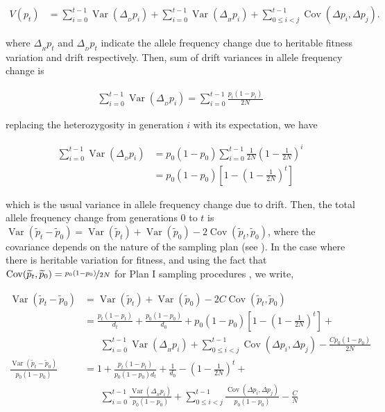 \documentclass[11pt]{article}
\DeclareMathOperator{\var}{Var}
\DeclareMathOperator{\cov}{Cov}
\begin{document}
\begin{align}
  V(p_t) &= \sum_{i=0}^{t-1} \var(\Delta_{_D} p_i) + \sum_{i=0}^{t-1} \var(\Delta_{_H} p_i) + \sum_{0 \le i < j}^{t-1} \cov(\Delta p_i, \Delta p_j).
\end{align}

where $\Delta_{_H} p_t$ and $\Delta_{_D} p_t$ indicate the allele frequency
change due to heritable fitness variation and drift respectively. Then, sum of
drift variances in allele frequency change is

\begin{align}
  \sum_{i=0}^{t-1} \var(\Delta_{_D} p_i) = \sum_{i=0}^{t-1} \frac{p_i(1-p_i)}{2N}
\end{align}

replacing the heterozygosity in generation $i$ with its expectation, we have

\begin{align}
  \sum_{i=0}^{t-1} \var(\Delta_{_D} p_i) &= p_0(1-p_0) \sum_{i=0}^{t-1} \frac{1}{2N} \left(1-\frac{1}{2N}\right)^i \\
                                         &= p_0(1-p_0) \left[1 - \left(1-\frac{1}{2N}\right)^t \right]
\end{align}

which is the usual variance in allele frequency change due to drift.  Then, the
total allele frequency change from generations $0$ to $t$ is
$\var(\widetilde{p}_t - \widetilde{p}_0) = \var(\widetilde{p}_t) +
\var(\widetilde{p}_0) - 2 \cov(\widetilde{p}_t, \widetilde{p}_0)$, where the
covariance depends on the nature of the sampling plan (see \cite{Nei1981-oy,
Waples1989-sj}). In the case where there is heritable variation for fitness,
and using the fact that $\cov(\widetilde{p}_t, \widetilde{p}_0) =
\nicefrac{p_0(1-p_0)}{2N}$ for Plan I sampling procedures
\parencite{Waples1989-sj}, we write,

\begin{align}
  \var(\widetilde{p}_t - \widetilde{p}_0) &= \var(\widetilde{p}_t) + \var(\widetilde{p}_0) - 2 C \cov(\widetilde{p}_t, \widetilde{p}_0) \\
                                          &= \frac{p_t(1-p_t)}{d_t}  + \frac{p_0(1-p_0)}{d_0} + p_0(1-p_0) \left[1 - \left(1-\frac{1}{2N}\right)^t \right] + \\ & \;\;\;\;\;\;
                                               \sum_{i=0}^{t-1} \var(\Delta_{_H} p_i)  + \sum_{0 \le i < j}^{t-1} \cov(\Delta p_i, \Delta p_j) - \frac{C p_0(1-p_0)}{2N} \\
  \frac{\var(\widetilde{p}_t - \widetilde{p}_0)}{p_0(1-p_0)} &= 1 + \frac{p_t(1-p_t)}{p_0(1-p_0)d_t}  + \frac{1}{d_0} - \left(1-\frac{1}{2N}\right)^t + \\ & \;\;\;\;\;\;
  \sum_{i=0}^{t-1} \frac{\var(\Delta_{_H} p_i)}{p_0(1-p_0)}  + \sum_{0 \le i < j}^{t-1} \frac{\cov(\Delta p_i, \Delta p_j)}{p_0(1-p_0)} - \frac{C}{N}
\end{align}
\end{document}
